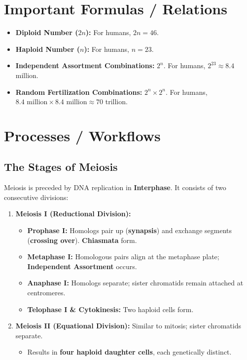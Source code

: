 \documentclass[11pt, a4paper]{article}
\begin{document}
\section*{Important Formulas / Relations}
\begin{itemize}
    \item \textbf{Diploid Number ($2n$):} For humans, $2n = 46$.
    \item \textbf{Haploid Number ($n$):} For humans, $n = 23$.
    \item \textbf{Independent Assortment Combinations:} $2^n$. For humans, $2^{23} \approx 8.4$ million.
    \item \textbf{Random Fertilization Combinations:} $2^n \times 2^n$. For humans, $8.4 \text{ million} \times 8.4 \text{ million} \approx 70$ trillion.
\end{itemize}

\section*{Processes / Workflows}

\subsection*{The Stages of Meiosis}
Meiosis is preceded by DNA replication in \textbf{Interphase}. It consists of two consecutive divisions:
\begin{enumerate}
    \item \textbf{Meiosis I (Reductional Division):}
    \begin{itemize}
        \item \textbf{Prophase I:} Homologs pair up (\textbf{synapsis}) and exchange segments (\textbf{crossing over}). \textbf{Chiasmata} form.
        \item \textbf{Metaphase I:} Homologous pairs align at the metaphase plate; \textbf{Independent Assortment} occurs.
        \item \textbf{Anaphase I:} Homologs separate; sister chromatids remain attached at centromeres.
        \item \textbf{Telophase I \& Cytokinesis:} Two haploid cells form.
    \end{itemize}
    \item \textbf{Meiosis II (Equational Division):} Similar to mitosis; sister chromatids separate.
    \begin{itemize}
        \item Results in \textbf{four haploid daughter cells}, each genetically distinct.
    \end{itemize}
\end{enumerate}
\end{document}
